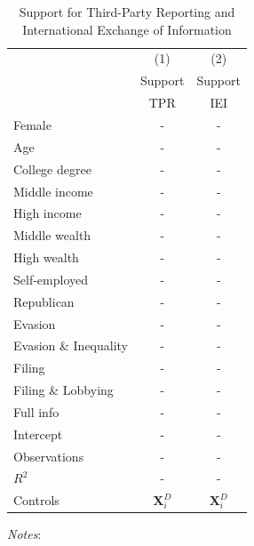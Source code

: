 \documentclass[11pt]{article}
\begin{document}
\begin{table}[!htbp]\centering
\caption{Support for Third-Party Reporting and International Exchange of Information}
\label{tab:supportTPRIEI}
\begin{threeparttable}
\begin{tabular}{l|cc}
\toprule
& (1) & (2) \\
 & Support & Support  \\
 & TPR  & IEI \\
\midrule
Female                     & - & -  \\
Age                        & - & -  \\
College degree             & - & -  \\
Middle income              & - & -  \\
High income                & - & -  \\
Middle wealth              & - & -  \\
High wealth                & - & -  \\
Self-employed              & - & -  \\
Republican                 & - & -  \\[1em]

Evasion        & - & - \\
Evasion \& Inequality     & - & - \\
Filing            & - & - \\
Filing \& Lobbying           & - & - \\
Full info               & - & - \\[0.5em]

Intercept              & - & - \\
\midrule
Observations                        &- &-      \\
$R^2$                               &- &-   \\
Controls                 &   $\mathbf{X}_{i}^{D}$ &  $\mathbf{X}_{i}^{D}$   \\
\bottomrule
\end{tabular}
\begin{tablenotes}[flushleft]
\footnotesize
\item \textit{Notes}:   
\end{tablenotes}
\end{threeparttable}
\end{table}
\end{document}

